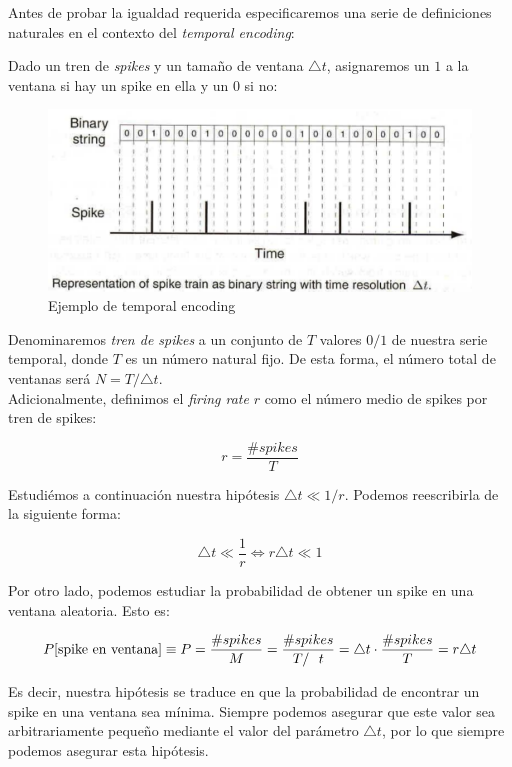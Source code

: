 \documentclass[11pt]{article}
\theoremstyle{plain}
\begin{document}
Antes de probar la igualdad requerida especificaremos una serie de definiciones naturales en el contexto del \emph{temporal encoding}:

Dado un tren de \emph{spikes} y un tamaño de ventana $\triangle t$, asignaremos un $1$ a la ventana si hay un spike en ella y un $0$ si no:

\begin{figure}[H]
	\centering
	\includegraphics[scale=0.5]{figures/temporal_encoding.PNG}
	\caption{Ejemplo de temporal encoding}
\end{figure}

Denominaremos \emph{tren de spikes} a un conjunto de $T$ valores $0/1$ de nuestra serie temporal, donde $T$ es un número natural fijo. De esta forma, el número total de ventanas será $N = T/\triangle t$. \\

Adicionalmente, definimos el \emph{firing rate} $r$ como el número medio de spikes por tren de spikes:

\[
	r = \frac{\#spikes}{T}
\]

Estudiémos a continuación nuestra hipótesis $\triangle t \ll 1/r$. Podemos reescribirla de la siguiente forma:

\[
	\triangle t \ll \frac{1}{r} \iff r \triangle t \ll 1
\]

Por otro lado, podemos estudiar la probabilidad de obtener un spike en una ventana aleatoria. Esto es:

\[
	P[\text{spike en ventana}] \equiv P = \frac{\#spikes}{M} = \frac{\#spikes}{T / \\
		 t} = \triangle t \cdot \frac{\#spikes}{T} = r \triangle t
\]

Es decir, nuestra hipótesis se traduce en que la probabilidad de encontrar un spike en una ventana sea mínima. Siempre podemos asegurar que este valor sea arbitrariamente pequeño mediante el valor del parámetro $\triangle t$, por lo que siempre podemos asegurar esta hipótesis. \\
\end{document}
